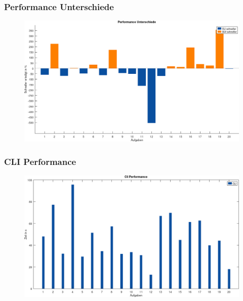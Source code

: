\documentclass{beamer}
\begin{document}
\begin{frame}
  \frametitle{Performance Unterschiede}

  \begin{figure}[H]
    \centering
    \includegraphics[scale=0.28]{performance-diff.png}
  \end{figure}
\end{frame}

\begin{frame}
  \frametitle{CLI Performance}

  \begin{figure}[H]
    \centering
    \includegraphics[scale=0.28]{performance-cli.png}
  \end{figure}
\end{frame}
\end{document}
